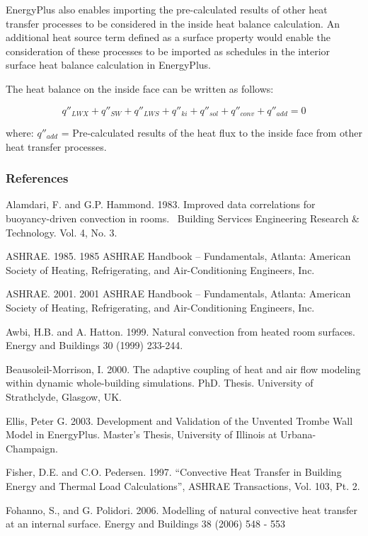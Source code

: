 EnergyPlus also enables importing the pre-calculated results of other heat transfer processes to be considered in the inside heat balance calculation. An additional heat source term defined as a surface property would enable the consideration of these processes to be imported as schedules in the interior surface heat balance calculation in EnergyPlus.

The heat balance on the inside face can be written as follows:

\begin{equation}
{q''_{LWX}} + {q''_{SW}} + {q''_{LWS}} + {q''_{ki}} + {q''_{sol}} + {q''_{conv}} + {q''_{add}} = 0
\end{equation}

where:
\(q''_{add}\) = Pre-calculated results of the heat flux to the inside face from other heat transfer processes.

\subsubsection{References}\label{references-032}

Alamdari, F. and G.P. Hammond. 1983. Improved data correlations for buoyancy-driven convection in rooms.~ Building Services Engineering Research \& Technology. Vol. 4, No. 3.

ASHRAE. 1985. 1985 ASHRAE Handbook -- Fundamentals, Atlanta: American Society of Heating, Refrigerating, and Air-Conditioning Engineers, Inc.

ASHRAE. 2001. 2001 ASHRAE Handbook -- Fundamentals, Atlanta: American Society of Heating, Refrigerating, and Air-Conditioning Engineers, Inc.

Awbi, H.B. and A. Hatton. 1999. Natural convection from heated room surfaces. Energy and Buildings 30 (1999) 233-244.

Beausoleil-Morrison, I. 2000. The adaptive coupling of heat and air flow modeling within dynamic whole-building simulations. PhD. Thesis. University of Strathclyde, Glasgow, UK.

Ellis, Peter G. 2003. Development and Validation of the Unvented Trombe Wall Model in EnergyPlus. Master's Thesis, University of Illinois at Urbana-Champaign.

Fisher, D.E. and C.O. Pedersen. 1997. ``Convective Heat Transfer in Building Energy and Thermal Load Calculations'', ASHRAE Transactions, Vol. 103, Pt. 2.

Fohanno, S., and G. Polidori. 2006. Modelling of natural convective heat transfer at an internal surface. Energy and Buildings 38 (2006) 548 - 553

